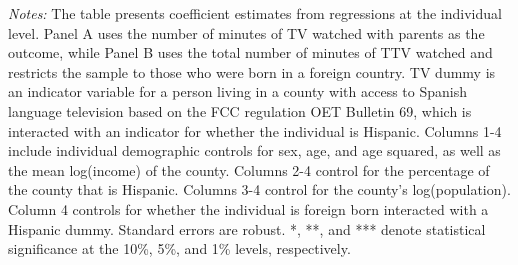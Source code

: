 \begin{table}[!htbp]
{\begin{threeparttable}
			\begin{tablenotes}[flushleft]
				\item \textit{Notes:} The table presents coefficient estimates from regressions at the individual level. Panel A uses the number of minutes of TV watched with parents as the outcome, while Panel B uses the total number of minutes of TTV watched and restricts the sample to those who were born in a foreign country. TV dummy is an indicator variable for a person living in a county with access to Spanish language television based on the FCC regulation OET Bulletin 69, which is interacted with an indicator for whether the individual is Hispanic. Columns 1-4 include individual demographic controls for sex, age, and age squared, as well as the mean log(income) of the county. Columns 2-4 control for the percentage of the county that is Hispanic. Columns 3-4 control for the county's log(population). Column 4 controls for whether the individual is foreign born interacted with a Hispanic dummy. Standard errors are robust. *, **, and *** denote statistical significance at the 10\%, 5\%, and 1\% levels, respectively.
			\end{tablenotes}
		\end{threeparttable}
	}
\end{table}